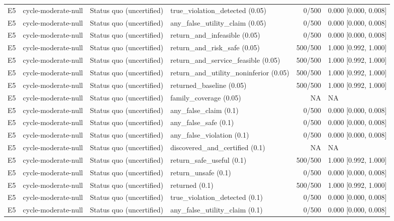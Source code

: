 \begin{longtable}{p{.04\linewidth}p{.18\linewidth}p{.19\linewidth}p{.16\linewidth}r p{.21\linewidth}}
E5 & cycle-moderate-null & Status quo (uncertified) & true\_violation\_detected (0.05) & 0/500 & 0.000 [0.000, 0.008]\\
E5 & cycle-moderate-null & Status quo (uncertified) & any\_false\_utility\_claim (0.05) & 0/500 & 0.000 [0.000, 0.008]\\
E5 & cycle-moderate-null & Status quo (uncertified) & return\_and\_infeasible (0.05) & 0/500 & 0.000 [0.000, 0.008]\\
E5 & cycle-moderate-null & Status quo (uncertified) & return\_and\_risk\_safe (0.05) & 500/500 & 1.000 [0.992, 1.000]\\
E5 & cycle-moderate-null & Status quo (uncertified) & return\_and\_service\_feasible (0.05) & 500/500 & 1.000 [0.992, 1.000]\\
E5 & cycle-moderate-null & Status quo (uncertified) & return\_and\_utility\_noninferior (0.05) & 500/500 & 1.000 [0.992, 1.000]\\
E5 & cycle-moderate-null & Status quo (uncertified) & returned\_baseline (0.05) & 500/500 & 1.000 [0.992, 1.000]\\
E5 & cycle-moderate-null & Status quo (uncertified) & family\_coverage (0.05) & NA & NA\\
E5 & cycle-moderate-null & Status quo (uncertified) & any\_false\_claim (0.1) & 0/500 & 0.000 [0.000, 0.008]\\
E5 & cycle-moderate-null & Status quo (uncertified) & any\_false\_safe (0.1) & 0/500 & 0.000 [0.000, 0.008]\\
E5 & cycle-moderate-null & Status quo (uncertified) & any\_false\_violation (0.1) & 0/500 & 0.000 [0.000, 0.008]\\
E5 & cycle-moderate-null & Status quo (uncertified) & discovered\_and\_certified (0.1) & NA & NA\\
E5 & cycle-moderate-null & Status quo (uncertified) & return\_safe\_useful (0.1) & 500/500 & 1.000 [0.992, 1.000]\\
E5 & cycle-moderate-null & Status quo (uncertified) & return\_unsafe (0.1) & 0/500 & 0.000 [0.000, 0.008]\\
E5 & cycle-moderate-null & Status quo (uncertified) & returned (0.1) & 500/500 & 1.000 [0.992, 1.000]\\
E5 & cycle-moderate-null & Status quo (uncertified) & true\_violation\_detected (0.1) & 0/500 & 0.000 [0.000, 0.008]\\
E5 & cycle-moderate-null & Status quo (uncertified) & any\_false\_utility\_claim (0.1) & 0/500 & 0.000 [0.000, 0.008]\\

\end{longtable}

